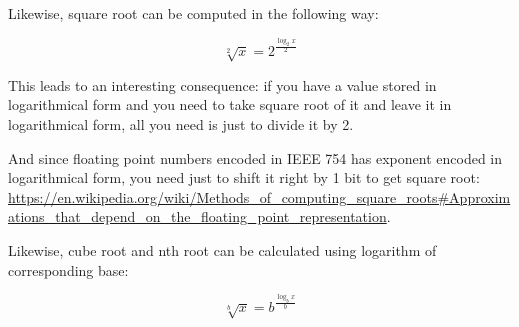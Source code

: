 
Likewise, square root can be computed in the following way:

\begin{equation}
\sqrt[2]{x} = 2^{\frac{\log_2{x}}{2}}
\end{equation}

This leads to an interesting consequence: if you have a value stored in logarithmical form and you need to take
square root of it and leave it in logarithmical form, all you need is just to divide it by 2.

And since floating point numbers encoded in IEEE 754 has exponent encoded in logarithmical form,
you need just to shift it right by 1 bit to get square root:
\url{https://en.wikipedia.org/wiki/Methods_of_computing_square_roots#Approximations_that_depend_on_the_floating_point_representation}.

Likewise, cube root and nth root can be calculated using logarithm of corresponding base:

\begin{equation}
\sqrt[b]{x} = b^{\frac{\log_b{x}}{b}}
\end{equation}


